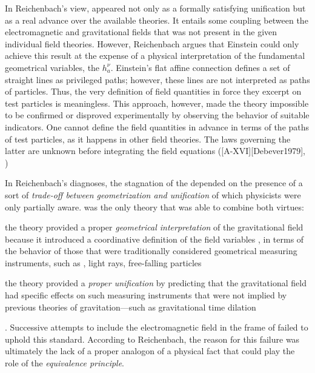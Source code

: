 \documentclass[draft]{article}
\newcommand{\hbein}{\ensuremath{h_{a}^{\nu}}\xspace}
\newcommand{\FP}{\german{Fernparallelismus}\xspace}
\begin{document}
In Reichenbach's view, \FP appeared not only as a formally satisfying unification but as a real advance over the available theories. It entails some coupling between the electromagnetic and gravitational fields that was not present in the given individual field theories. However, Reichenbach argues that Einstein could only achieve this result at the expense of a physical interpretation of the fundamental geometrical variables, the \hbein. Einstein's flat affine connection defines a set of straight lines as privileged paths; however, these lines are not interpreted as paths of particles. Thus, the very definition of field quantities in force they excerpt on test particles is meaningless. This approach, however, made the theory impossible to be confirmed or disproved experimentally by observing the behavior of suitable indicators. One cannot define the field quantities in advance in terms of the paths of test particles, as it happens in other field theories. The laws governing the latter are unknown before integrating the field equations ([A-XVI][Debever1979], \citep[23]{Einstein1930i})





In Reichenbach's diagnoses, the stagnation of the \uftp depended on the presence of a sort of \emph{trade-off between geometrization and unification} of which physicists were only partially aware. \Gr was the only theory that was able to combine both virtues: \begin{inparaenum}[(1)] \item the theory provided a proper \emph{geometrical interpretation} of the gravitational field because it introduced a coordinative definition of the field variables \gmn, in terms of the behavior of those that were traditionally considered geometrical measuring instruments, such as \rac, light rays, free-falling particles \item the theory provided a \emph{proper unification} by predicting that the gravitational field had specific effects on such measuring instruments that were not implied by previous theories of gravitation---such as gravitational time dilation \end{inparaenum} \citep[350]{Reichenbach1928}. Successive attempts to include the electromagnetic field in the frame of \gr failed to uphold this standard. 
According to Reichenbach, the reason for this failure was ultimately the lack of a proper analogon of a physical fact that could play the role of the \emph{equivalence principle}. 
\end{document}
